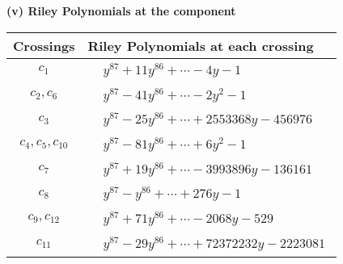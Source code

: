 \documentclass[1p]{elsarticle_modified}
\theoremstyle{definition}
\begin{document}
\newpage\renewcommand{\arraystretch}{1}
\flushleft \textbf{(v) Riley Polynomials at the component}\newline \\
\begin{tabular}{m{50pt}|m{274pt}}
Crossings & \hspace{64pt}Riley Polynomials at each crossing \\
\hline $$\begin{aligned}c_{1}\end{aligned}$$&$\begin{aligned}
&y^{87}+11 y^{86}+\cdots-4 y-1
\end{aligned}$\\
\hline $$\begin{aligned}c_{2},c_{6}\end{aligned}$$&$\begin{aligned}
&y^{87}-41 y^{86}+\cdots-2 y^2-1
\end{aligned}$\\
\hline $$\begin{aligned}c_{3}\end{aligned}$$&$\begin{aligned}
&y^{87}-25 y^{86}+\cdots+2553368 y-456976
\end{aligned}$\\
\hline $$\begin{aligned}c_{4},c_{5},c_{10}\end{aligned}$$&$\begin{aligned}
&y^{87}-81 y^{86}+\cdots+6 y^2-1
\end{aligned}$\\
\hline $$\begin{aligned}c_{7}\end{aligned}$$&$\begin{aligned}
&y^{87}+19 y^{86}+\cdots-3993896 y-136161
\end{aligned}$\\
\hline $$\begin{aligned}c_{8}\end{aligned}$$&$\begin{aligned}
&y^{87}- y^{86}+\cdots+276 y-1
\end{aligned}$\\
\hline $$\begin{aligned}c_{9},c_{12}\end{aligned}$$&$\begin{aligned}
&y^{87}+71 y^{86}+\cdots-2068 y-529
\end{aligned}$\\
\hline $$\begin{aligned}c_{11}\end{aligned}$$&$\begin{aligned}
&y^{87}-29 y^{86}+\cdots+72372232 y-2223081
\end{aligned}$\\
\hline
\end{tabular}\\~\\
\end{document}
